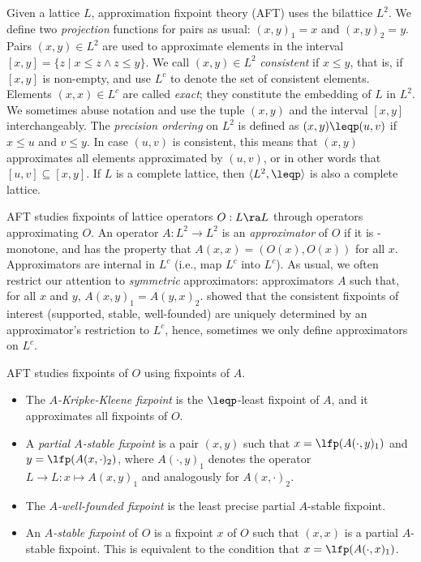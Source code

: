 Given a lattice $L$, approximation fixpoint theory (AFT) \cite{DeneckerMT00} uses the bilattice 
$L^2$.  We define two \emph{projection} functions for pairs as usual:
$(x,y)_1=x$ and $(x,y)_2=y$.  Pairs $(x,y)\in L^2$ are used to
approximate elements in the interval $[x,y] = \{z\mid x\leq
z\wedge z\leq y\}$. We call $(x,y)\in L^2$ \emph{consistent} if $x\leq 
y$, that is, if $[x,y]$ is non-empty, and use $L^c$ to denote the set
of consistent elements. Elements $(x,x) \in L^c$ are called
\emph{exact}; they constitute the embedding of $L$ in $L^2$.  We sometimes abuse notation and use the tuple $(x,y)$
and the interval $[x,y]$ interchangeably.  The \emph{precision
  ordering} on $L^2$ is defined as $(x,y) \leqp (u,v)$ if $x\leq u$
and $v\leq y$. In case $(u,v)$ is consistent, this means that $(x,y)$
approximates all elements approximated by $(u,v)$, or in other words
that $[u,v]\subseteq [x,y]$.  If $L$ is a complete lattice, then
$\langle L^2,\leqp\rangle$ is also a complete lattice.
  


AFT studies fixpoints of lattice operators $O:L\ra L$ through operators approximating $O$.
 An operator $A: L^2\to L^2$  is an \emph{approximator} of $O$ if it is \leqp-monotone,  and has the property that $A(x,x) = (O(x),O(x))$ for all $x$. %
Approximators are internal in $L^c$ (i.e., map $L^c$ into $L^c$).
As usual, we often restrict our attention to \emph{symmetric} approximators: approximators $A$ such that, for all $x$ and $y$, $A(x,y)_1 = A(y,x)_2$.%
\citet{DeneckerMT04} showed that the consistent fixpoints of interest (supported, stable, well-founded) are uniquely determined by an approximator's restriction to $L^c$, hence, sometimes we only define approximators on $L^c$. 

AFT studies fixpoints of $O$ using fixpoints of $A$. 
 \begin{itemize}
  \item The \emph{$A$-Kripke-Kleene fixpoint} is the $\leqp$-least fixpoint of $A$, and it approximates all fixpoints of $O$. 
\item A \emph{partial $A$-stable fixpoint} is a pair  $(x,y)$ such that $x=\lfp(A(\cdot,y)_1)$ and $y=\lfp(A(x,\cdot)_2)$, where $A(\cdot,y)_1$ denotes the operator $L\to L:x\mapsto A(x,y)_1$ and analogously for $A(x,\cdot)_2$. 
\item The \emph{$A$-well-founded fixpoint} is the least precise partial $A$-stable fixpoint. 
\item  An \emph{$A$-stable fixpoint} of $O$ is a fixpoint $x$ of $O$ such that $(x,x)$ is a partial $A$-stable fixpoint. This is equivalent to the condition that $x=\lfp(A(\cdot, x)_1)$.
 \end{itemize}

